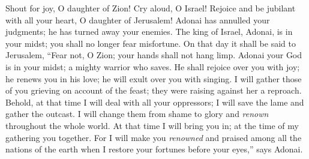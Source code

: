 \begin{biblechapter}
\verse Shout for joy, O daughter of Zion! 
Cry aloud, O Israel! 
Rejoice and be jubilant with all your heart, 
O daughter of Jerusalem!
\verse Adonai has annulled your judgments; 
he has turned away your enemies. 
The king of Israel, Adonai, is in your midst; 
you shall no longer fear misfortune.
\verse On that day it shall be said to Jerusalem, 
“Fear not, O Zion; 
your hands shall not hang limp.
\verse Adonai your God is in your midst; 
a mighty warrior who saves. 
He shall rejoice over you with joy; 
he renews you in his love; 
he will exult over you with singing.
\verse I will gather those of you grieving on account of the feast; 
they were raising against her a reproach.
\verse Behold, at that time I will deal with all your oppressors; 
I will save the lame and gather the outcast. 
I will change them from shame 
to glory and \textit{renown} throughout the whole world.
\verse At that time I will bring you in; 
at the time of my gathering you together. 
For I will make you \textit{renowned} and praised 
among all the nations of the earth 
when I restore your fortunes before your eyes,” 
says Adonai.
\end{biblechapter}

